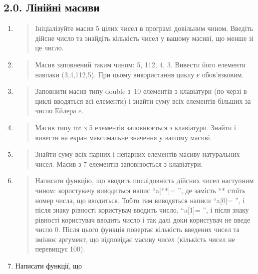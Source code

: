 \documentclass[]{article}
\begin{document}
\subsection{2.0. Лінійні
масиви}\label{ux43bux456ux43dux456ux439ux43dux456-ux43cux430ux441ux438ux432ux438}

\begin{enumerate}
\def\labelenumi{\arabic{enumi})}
\item
  \begin{quote}
  Ініціалізуйте масив 5 цілих чисел в програмі довільним чином. Введіть
  дійсне число та знайдіть кількість чисел у вашому масиві, що менше зі
  це число.
  \end{quote}
\item
  \begin{quote}
  Масив заповнений таким чином: 5, 112, 4, 3. Вивести його елементи
  навпаки (3,4,112,5). При цьому використання циклу є обов'язковим.
  \end{quote}
\item
  \begin{quote}
  Заповнити масив типу double з~10 елементів з клавіатури (по черзі в
  циклі вводяться всі елементи) і знайти суму всіх елементів більших за
  число Ейлера \(e\).
  \end{quote}
\item
  \begin{quote}
  Масив типу int з 5 елементів заповнюється з клавіатури. Знайти і
  вивести на екран максимальне значення у вашому масиві.
  \end{quote}
\item
  \begin{quote}
  Знайти суму всіх парних і непарних елементів масиву натуральних чисел.
  Масив з 7 елементів заповнюється з клавіатури.
  \end{quote}
\item
  \begin{quote}
  Написати функцію, що вводить послідовність дійсних чисел наступним
  чином: користувачу виводиться напис ``a{[}**{]}= '', де замість **
  стоїть номер числа, що вводиться. Тобто там виводяться написи
  ``a{[}0{]}= '', і після знаку рівності користувач вводить число,
  ``a{[}1{]}= '', і після знаку рівності користувач вводить число і так
  далі доки користувач не введе число 0. Після цього функція повертає
  кількість введених чисел та змінює аргумент, що відповідає масиву
  чисел (кількість чисел не перевищує 100).
  \end{quote}
\item
  Написати функції, що
\end{enumerate}
\end{document}
